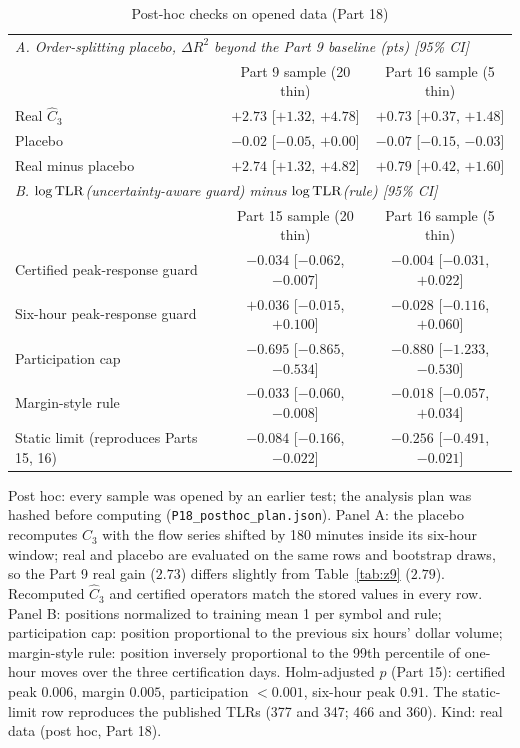 \begin{table}[!tbp]\centering\small
\begin{threeparttable}
\caption{Post-hoc checks on opened data (Part 18)}\label{tab:p18}
\footnotesize\setlength{\tabcolsep}{3pt}
\begin{tabular}{lcc}
\toprule
\multicolumn{3}{l}{\emph{A. Order-splitting placebo, $\Delta R^2$ beyond the Part 9 baseline (pts) [95\% CI]}}\\
 & Part 9 sample (20 thin) & Part 16 sample (5 thin)\\
\midrule
Real $\hat C_3$ & $+2.73$ [$+1.32$, $+4.78$] & $+0.73$ [$+0.37$, $+1.48$]\\
Placebo & $-0.02$ [$-0.05$, $+0.00$] & $-0.07$ [$-0.15$, $-0.03$]\\
Real minus placebo & $+2.74$ [$+1.32$, $+4.82$] & $+0.79$ [$+0.42$, $+1.60$]\\
\midrule
\multicolumn{3}{l}{\emph{B. $\log{\rm TLR}$(uncertainty-aware guard) minus $\log{\rm TLR}$(rule) [95\% CI]}}\\
 & Part 15 sample (20 thin) & Part 16 sample (5 thin)\\
\midrule
Certified peak-response guard & $-0.034$ [$-0.062$, $-0.007$] & $-0.004$ [$-0.031$, $+0.022$]\\
Six-hour peak-response guard & $+0.036$ [$-0.015$, $+0.100$] & $-0.028$ [$-0.116$, $+0.060$]\\
Participation cap & $-0.695$ [$-0.865$, $-0.534$] & $-0.880$ [$-1.233$, $-0.530$]\\
Margin-style rule & $-0.033$ [$-0.060$, $-0.008$] & $-0.018$ [$-0.057$, $+0.034$]\\
Static limit (reproduces Parts 15, 16) & $-0.084$ [$-0.166$, $-0.022$] & $-0.256$ [$-0.491$, $-0.021$]\\
\bottomrule
\end{tabular}
\begin{tablenotes}\footnotesize\item Post hoc: every sample was opened by an earlier test; the analysis plan was hashed before computing (\texttt{P18\_posthoc\_plan.json}). Panel A: the placebo recomputes $\hat C_3$ with the flow series shifted by 180 minutes inside its six-hour window; real and placebo are evaluated on the same rows and bootstrap draws, so the Part 9 real gain ($2.73$) differs slightly from Table~\ref{tab:z9} ($2.79$). Recomputed $\hat C_3$ and certified operators match the stored values in every row. Panel B: positions normalized to training mean 1 per symbol and rule; participation cap: position proportional to the previous six hours' dollar volume; margin-style rule: position inversely proportional to the 99th percentile of one-hour moves over the three certification days. Holm-adjusted $p$ (Part 15): certified peak $0.006$, margin $0.005$, participation $<0.001$, six-hour peak $0.91$. The static-limit row reproduces the published TLRs (377 and 347; 466 and 360). Kind: real data (post hoc, Part 18).\end{tablenotes}
\end{threeparttable}
\end{table}

